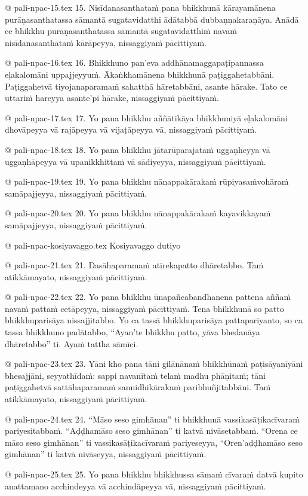 @ pali-npac-15.tex
15. Nisīdanasanthataṁ pana bhikkhunā kārayamānena purāṇasanthatassa sāmantā sugatavidatthi ādātabbā dubbaṇṇakaraṇāya. Anādā ce bhikkhu purāṇasanthatassa sāmantā sugatavidatthiṁ navaṁ nisīdanasanthataṁ kārāpeyya, nissaggiyaṁ pācittiyaṁ.

@ pali-npac-16.tex
16. Bhikkhuno pan’eva addhānamaggapaṭipannassa eḷakalomāni uppajjeyyuṁ. Ākaṅkhamānena bhikkhunā paṭiggahetabbāni. Paṭiggahetvā tiyojanaparamaṁ sahatthā hāretabbāni, asante hārake. Tato ce uttariṁ hareyya asante’pi hārake, nissaggiyaṁ pācittiyaṁ.

@ pali-npac-17.tex
17. Yo pana bhikkhu aññātikāya bhikkhuniyā eḷakalomāni dhovāpeyya vā rajāpeyya vā vijaṭāpeyya vā, nissaggiyaṁ pācittiyaṁ.

@ pali-npac-18.tex
18. Yo pana bhikkhu jātarūparajataṁ uggaṇheyya vā uggaṇhāpeyya vā upanikkhittaṁ vā sādiyeyya, nissaggiyaṁ pācittiyaṁ.

@ pali-npac-19.tex
19. Yo pana bhikkhu nānappakārakaṁ rūpiyasaṁvohāraṁ samāpajjeyya, nissaggiyaṁ pācittiyaṁ.

@ pali-npac-20.tex
20. Yo pana bhikkhu nānappakārakaṁ kayavikkayaṁ samāpajjeyya, nissaggiyaṁ pācittiyaṁ.

@ pali-npac-kosiyavaggo.tex
Kosiyavaggo dutiyo

@ pali-npac-21.tex
21. Dasāhaparamaṁ atirekapatto dhāretabbo. Taṁ atikkāmayato, nissaggiyaṁ pācittiyaṁ.

@ pali-npac-22.tex
22. Yo pana bhikkhu ūnapañcabandhanena pattena aññaṁ navaṁ pattaṁ cetāpeyya, nissaggiyaṁ pācittiyaṁ. Tena bhikkhunā so patto bhikkhuparisāya nissajjitabbo. Yo ca tassā bhikkhuparisāya pattapariyanto, so ca tassa bhikkhuno padātabbo, “Ayan’te bhikkhu patto, yāva bhedanāya dhāretabbo” ti. Ayaṁ tattha sāmīci.

@ pali-npac-23.tex
23. Yāni kho pana tāni gilānānaṁ bhikkhūnaṁ paṭisāyanīyāni bhesajjāni, seyyathīdaṁ: sappi navanītaṁ telaṁ madhu phāṇitaṁ; tāni paṭiggahetvā sattāhaparamaṁ sannidhikārakaṁ paribhuñjitabbāni. Taṁ atikkāmayato, nissaggiyaṁ pācittiyaṁ.

@ pali-npac-24.tex
24. “Māso seso gimhānan” ti bhikkhunā vassikasāṭikacīvaraṁ pariyesitabbaṁ. “Aḍḍhamāso seso gimhānan” ti katvā nivāsetabbaṁ. “Orena ce māso seso gimhānan” ti vassikasāṭikacīvaraṁ pariyeseyya, “Oren’aḍḍhamāso seso gimhānan” ti katvā nivāseyya, nissaggiyaṁ pācittiyaṁ.

@ pali-npac-25.tex
25. Yo pana bhikkhu bhikkhussa sāmaṁ cīvaraṁ datvā kupito anattamano acchindeyya vā acchindāpeyya vā, nissaggiyaṁ pācittiyaṁ.

